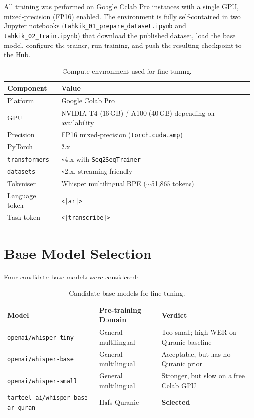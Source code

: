 All training was performed on Google Colab Pro instances with a single
GPU, mixed-precision (FP16) enabled. The environment is fully
self-contained in two Jupyter notebooks (\texttt{tahkik\_01\_prepare\_dataset.ipynb} and
\texttt{tahkik\_02\_train.ipynb}) that download the published dataset,
load the base model, configure the trainer, run training, and push the
resulting checkpoint to the Hub.

\begin{table}[H]
  \centering
  \caption{Compute environment used for fine-tuning.}
  \label{tab:mt_env}
  \renewcommand{\arraystretch}{1.3}
  \begin{tabular}{lp{8.5cm}}
    \toprule
    \textbf{Component} & \textbf{Value} \\
    \midrule
    Platform & Google Colab Pro \\
    GPU      & NVIDIA T4 (16\,GB) / A100 (40\,GB) depending on availability \\
    Precision & FP16 mixed-precision (\texttt{torch.cuda.amp}) \\
    PyTorch  & 2.x \\
    \texttt{transformers} & v4.x with \texttt{Seq2SeqTrainer} \\
    \texttt{datasets} & v2.x, streaming-friendly \\
    Tokeniser & Whisper multilingual BPE ($\sim$51{,}865 tokens) \\
    Language token & \texttt{<|ar|>} \\
    Task token & \texttt{<|transcribe|>} \\
    \bottomrule
  \end{tabular}
\end{table}

\section{Base Model Selection}

Four candidate base models were considered:

\begin{table}[H]
  \centering
  \caption{Candidate base models for fine-tuning.}
  \label{tab:mt_base_candidates}
  \renewcommand{\arraystretch}{1.3}
  \begin{tabular}{lll}
    \toprule
    \textbf{Model} & \textbf{Pre-training Domain} & \textbf{Verdict} \\
    \midrule
    \texttt{openai/whisper-tiny}  & General multilingual & Too small; high WER on Quranic baseline \\
    \texttt{openai/whisper-base}  & General multilingual & Acceptable, but has no Quranic prior \\
    \texttt{openai/whisper-small} & General multilingual & Stronger, but slow on a free Colab GPU \\
    \texttt{tarteel-ai/whisper-base-ar-quran} & Hafs Quranic & \textbf{Selected} \\
    \bottomrule
  \end{tabular}
\end{table}

